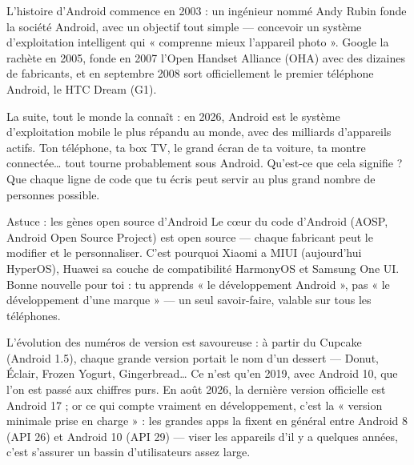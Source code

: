 


L'histoire d'Android commence en 2003 : un ingénieur nommé Andy Rubin fonde la société Android, avec un objectif tout simple — concevoir un système d'exploitation intelligent qui « comprenne mieux l'appareil photo ». Google la rachète en 2005, fonde en 2007 l'Open Handset Alliance (OHA) avec des dizaines de fabricants, et en septembre 2008 sort officiellement le premier téléphone Android, le HTC Dream (G1).

La suite, tout le monde la connaît : en 2026, Android est le système d'exploitation mobile le plus répandu au monde, avec des milliards d'appareils actifs. Ton téléphone, ta box TV, le grand écran de ta voiture, ta montre connectée… tout tourne probablement sous Android. Qu'est-ce que cela signifie ? Que chaque ligne de code que tu écris peut servir au plus grand nombre de personnes possible.

\begin{tcbinfo}{Astuce : les gènes open source d'Android}
Le cœur du code d'Android (AOSP, Android Open Source Project) est open source — chaque fabricant peut le modifier et le personnaliser. C'est pourquoi Xiaomi a MIUI (aujourd'hui HyperOS), Huawei sa couche de compatibilité HarmonyOS et Samsung One UI. Bonne nouvelle pour toi : tu apprends « le développement Android », pas « le développement d'une marque » — un seul savoir-faire, valable sur tous les téléphones.

\end{tcbinfo}

L'évolution des numéros de version est savoureuse : à partir du Cupcake (Android 1.5), chaque grande version portait le nom d'un dessert — Donut, Éclair, Frozen Yogurt, Gingerbread… Ce n'est qu'en 2019, avec Android 10, que l'on est passé aux chiffres purs. En août 2026, la dernière version officielle est Android 17 ; or ce qui compte vraiment en développement, c'est la « version minimale prise en charge » : les grandes apps la fixent en général entre Android 8 (API 26) et Android 10 (API 29) — viser les appareils d'il y a quelques années, c'est s'assurer un bassin d'utilisateurs assez large.

